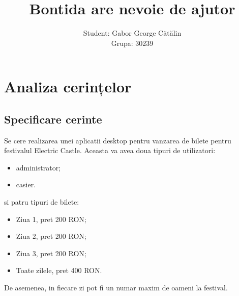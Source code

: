 \documentclass[11pt,a4paper,twoside,notitlepage]{article}
\begin{document}
\title{Bontida are nevoie de ajutor}

\author{
Student: Gabor George C\u{a}t\u{a}lin\\ %
Grupa: 30239\\
}

\maketitle 

\newpage

\tableofcontents



\newpage

\section{Analiza cerințelor}

\subsection{Specificare cerinte}
Se cere realizarea unei aplicatii desktop pentru vanzarea de bilete pentru festivalul Electric Castle. Aceasta va avea doua tipuri de utilizatori: 
\begin{itemize}
	\item administrator;
	\item casier.
\end{itemize}
si patru tipuri de bilete:
\begin{itemize}
	\item Ziua 1, pret 200 RON;
	\item Ziua 2, pret 200 RON;
	\item Ziua 3, pret 200 RON;
	\item Toate zilele, pret 400 RON.
\end{itemize}
De asemenea, in fiecare zi pot fi un numar maxim de oameni la festival.
\end{document}
